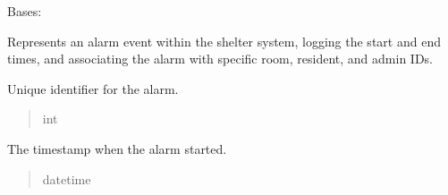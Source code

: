 \documentclass[letterpaper,10pt,english]{sphinxmanual}
\begin{document}
\begin{fulllineitems}
\label{\detokenize{app.models:app.models.alarm.Alarm}}
\pysigstartsignatures
\pysiglinewithargsret
{}
{\sphinxparamcomma {}\sphinxparamcomma {}\sphinxparamcomma {}\sphinxparamcomma {}\sphinxparamcomma {}}
{}
\pysigstopsignatures
\sphinxAtStartPar
Bases: 

\sphinxAtStartPar
Represents an alarm event within the shelter system, logging the start and end times,
and associating the alarm with specific room, resident, and admin IDs.

\begin{fulllineitems}
\label{\detokenize{app.models:app.models.alarm.Alarm.idAlarm}}
\pysigstartsignatures
\pysigline
{}
\pysigstopsignatures
\sphinxAtStartPar
Unique identifier for the alarm.
\begin{quote}\begin{description}
\sphinxAtStartPar
int

\end{description}\end{quote}

\end{fulllineitems}


\begin{fulllineitems}
\label{\detokenize{app.models:app.models.alarm.Alarm.start}}
\pysigstartsignatures
\pysigline
{}
\pysigstopsignatures
\sphinxAtStartPar
The timestamp when the alarm started.
\begin{quote}\begin{description}
\sphinxAtStartPar
datetime


\end{description}
\end{quote}
\end{fulllineitems}
\end{fulllineitems}
\end{document}
